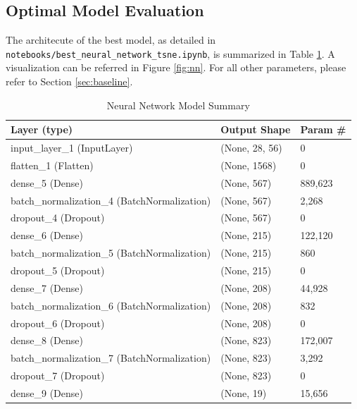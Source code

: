 \documentclass{article}
\begin{document}
\subsection{Optimal Model Evaluation}
\label{sec:optimalNN}

The architecute of the best model, as detailed in \texttt{notebooks/best\_neural\_network\_tsne.ipynb}, is summarized in Table \ref{table:nn_summary}. A visualization can be referred in Figure \ref{fig:nn}. For all other parameters, please refer to Section \ref{sec:baseline}.



\begin{table}[!htbp]
\centering
{\ttfamily
\begin{tabular}{|l|l|l|}
\hline
\textbf{Layer (type)}             & \textbf{Output Shape} & \textbf{Param \#} \\ \hline
input\_layer\_1 (InputLayer)      & (None, 28, 56)        & 0                 \\ \hline
flatten\_1 (Flatten)              & (None, 1568)          & 0                 \\ \hline
dense\_5 (Dense)                  & (None, 567)           & 889,623           \\ \hline
batch\_normalization\_4 (BatchNormalization) & (None, 567) & 2,268             \\ \hline
dropout\_4 (Dropout)              & (None, 567)           & 0                 \\ \hline
dense\_6 (Dense)                  & (None, 215)           & 122,120           \\ \hline
batch\_normalization\_5 (BatchNormalization) & (None, 215) & 860               \\ \hline
dropout\_5 (Dropout)              & (None, 215)           & 0                 \\ \hline
dense\_7 (Dense)                  & (None, 208)           & 44,928            \\ \hline
batch\_normalization\_6 (BatchNormalization) & (None, 208) & 832               \\ \hline
dropout\_6 (Dropout)              & (None, 208)           & 0                 \\ \hline
dense\_8 (Dense)                  & (None, 823)           & 172,007           \\ \hline
batch\_normalization\_7 (BatchNormalization) & (None, 823) & 3,292             \\ \hline
dropout\_7 (Dropout)              & (None, 823)           & 0                 \\ \hline
dense\_9 (Dense)                  & (None, 19)            & 15,656            \\ \hline
\end{tabular}
}
\caption{Neural Network Model Summary}
\label{table:nn_summary}
\end{table}
\end{document}
